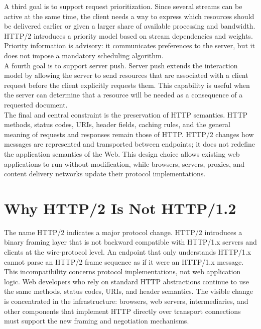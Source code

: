 \documentclass{scrbook}
\begin{document}
A third goal is to support request prioritization. Since several streams can be active at the same time, the client needs a way to express which resources should be delivered earlier or given a larger share of available processing and bandwidth. HTTP/2 introduces a priority model based on stream dependencies and weights. Priority information is advisory: it communicates preferences to the server, but it does not impose a mandatory scheduling algorithm.\\

A fourth goal is to support server push. Server push extends the interaction model by allowing the server to send resources that are associated with a client request before the client explicitly requests them. This capability is useful when the server can determine that a resource will be needed as a consequence of a requested document.\\

The final and central constraint is the preservation of HTTP semantics. HTTP methods, status codes, URIs, header fields, caching rules, and the general meaning of requests and responses remain those of HTTP. HTTP/2 changes how messages are represented and transported between endpoints; it does not redefine the application semantics of the Web. This design choice allows existing web applications to run without modification, while browsers, servers, proxies, and content delivery networks update their protocol implementations.

\section{Why HTTP/2 Is Not HTTP/1.2}

The name HTTP/2 indicates a major protocol change. HTTP/2 introduces a binary framing layer that is not backward compatible with HTTP/1.x servers and clients at the wire-protocol level. An endpoint that only understands HTTP/1.x cannot parse an HTTP/2 frame sequence as if it were an HTTP/1.x message.\\

This incompatibility concerns protocol implementations, not web application logic. Web developers who rely on standard HTTP abstractions continue to use the same methods, status codes, URIs, and header semantics. The visible change is concentrated in the infrastructure: browsers, web servers, intermediaries, and other components that implement HTTP directly over transport connections must support the new framing and negotiation mechanisms.\\
\end{document}
